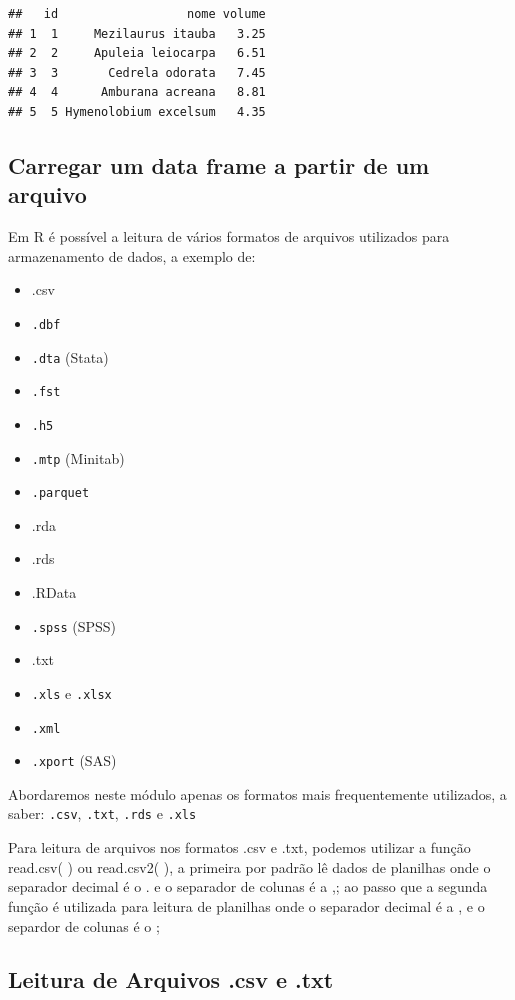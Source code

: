 \documentclass[
]{article}
\begin{document}
\begin{verbatim}
##   id                  nome volume
## 1  1     Mezilaurus itauba   3.25
## 2  2     Apuleia leiocarpa   6.51
## 3  3       Cedrela odorata   7.45
## 4  4      Amburana acreana   8.81
## 5  5 Hymenolobium excelsum   4.35
\end{verbatim}

\hypertarget{carregar-um-data-frame-a-partir-de-um-arquivo}{%
\subsection{Carregar um data frame a partir de um
arquivo}\label{carregar-um-data-frame-a-partir-de-um-arquivo}}

Em R é possível a leitura de vários formatos de arquivos utilizados para
armazenamento de dados, a exemplo de:

\begin{itemize}
\item
  .csv
\item
  \texttt{.dbf}
\item
  \texttt{.dta} (Stata)
\item
  \texttt{.fst}
\item
  \texttt{.h5}
\item
  \texttt{.mtp} (Minitab)
\item
  \texttt{.parquet}
\item
  .rda
\item
  .rds
\item
  .RData
\item
  \texttt{.spss} (SPSS)
\item
  .txt
\item
  \texttt{.xls} e \texttt{.xlsx}
\item
  \texttt{.xml}
\item
  \texttt{.xport} (SAS)
\end{itemize}

Abordaremos neste módulo apenas os formatos mais frequentemente
utilizados, a saber: \texttt{.csv}, \texttt{.txt}, \texttt{.rds} e
\texttt{.xls}

Para leitura de arquivos nos formatos .csv e .txt, podemos utilizar a
função read.csv( ) ou read.csv2( ), a primeira por padrão lê dados de
planilhas onde o separador decimal é o . e o separador de colunas é a ,;
ao passo que a segunda função é utilizada para leitura de planilhas onde
o separador decimal é a , e o separdor de colunas é o ;

\hypertarget{leitura-de-arquivos-.csv-e-.txt}{%
\subsection{Leitura de Arquivos .csv e
.txt}\label{leitura-de-arquivos-.csv-e-.txt}}
\end{document}
